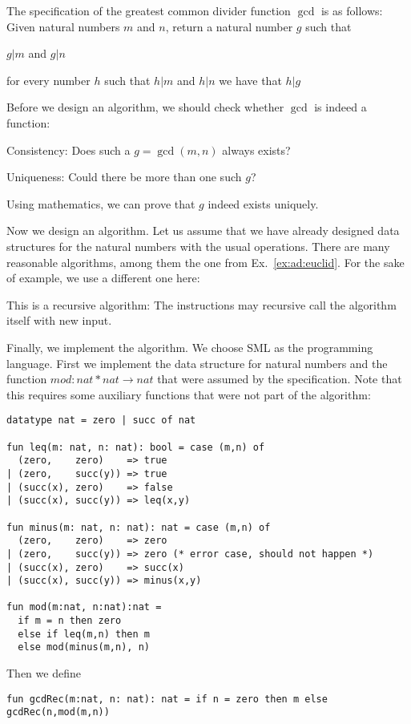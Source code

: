\begin{example}\label{ex:ad:euclid2}
The specification of the greatest common divider function $\gcd$ is as follows:
Given natural numbers $m$ and $n$, return a natural number $g$ such that
\begin{compactitem}
\item $g|m$ and $g|n$
\item for every number $h$ such that $h|m$ and $h|n$ we have that $h|g$
\end{compactitem}
\medskip

Before we design an algorithm, we should check whether $\gcd$ is indeed a function:
\begin{compactitem}
  \item Consistency: Does such a $g=\gcd(m,n)$ always exists?
  \item Uniqueness: Could there be more than one such $g$?
\end{compactitem}
Using mathematics, we can prove that $g$ indeed exists uniquely.
\medskip

Now we design an algorithm.
Let us assume that we have already designed data structures for the natural numbers with the usual operations.
There are many reasonable algorithms, among them the one from Ex.~\ref{ex:ad:euclid}.
For the sake of example, we use a different one here:
\medskip

\begin{acode}
\end{acode}

\medskip
This is a recursive algorithm: The instructions may recursive call the algorithm itself with new input.
\medskip

Finally, we implement the algorithm.
We choose SML as the programming language.
First we implement the data structure for natural numbers and the function $mod:nat*nat \to nat$ that were assumed by the specification.
Note that this requires some auxiliary functions that were not part of the algorithm:
\begin{lstlisting}
datatype nat = zero | succ of nat

fun leq(m: nat, n: nat): bool = case (m,n) of
  (zero,    zero)    => true
| (zero,    succ(y)) => true
| (succ(x), zero)    => false
| (succ(x), succ(y)) => leq(x,y)

fun minus(m: nat, n: nat): nat = case (m,n) of
  (zero,    zero)    => zero
| (zero,    succ(y)) => zero (* error case, should not happen *)
| (succ(x), zero)    => succ(x)
| (succ(x), succ(y)) => minus(x,y)
  
fun mod(m:nat, n:nat):nat =
  if m = n then zero
  else if leq(m,n) then m
  else mod(minus(m,n), n)
\end{lstlisting}
 
Then we define
\begin{lstlisting}
fun gcdRec(m:nat, n: nat): nat = if n = zero then m else gcdRec(n,mod(m,n))
\end{lstlisting}
\end{example}

